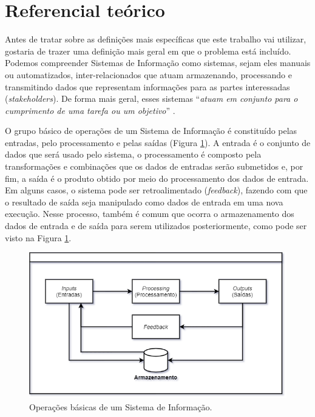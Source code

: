 \section{Referencial teórico}
\label{sec:referencialTeorico}

Antes de tratar sobre as definições mais específicas que este trabalho vai utilizar, gostaria de trazer uma definição mais geral em que o problema está incluído. Podemos compreender Sistemas de Informação como sistemas, sejam eles manuais ou automatizados, inter-relacionados que atuam armazenando, processando e transmitindo dados que representam informações para as partes interessadas (\textit{stakeholders}). De forma mais geral, esses sistemas \enquote{\textit{atuam em conjunto para o cumprimento de uma tarefa ou um objetivo}} \cite{turban2009business}.

O grupo básico de operações de um Sistema de Informação é constituído pelas entradas, pelo processamento e pelas saídas (Figura \ref{fig:operacoesBasicaSistemas}). A entrada é o conjunto de dados que será usado pelo sistema, o processamento é composto pela transformações e combinações que os dados de entradas serão submetidos e, por fim, a saída é o produto obtido por meio do processamento dos dados de entrada. Em alguns casos, o sistema pode ser retroalimentado (\textit{feedback}), fazendo com que o resultado de saída seja manipulado como dados de entrada em uma nova execução. Nesse processo, também é comum que ocorra o armazenamento dos dados de entrada e de saída para serem utilizados posteriormente, como pode ser visto na Figura \ref{fig:operacoesBasicaSistemas}.

\begin{figure}[ht]
\centering
\includegraphics[width=1\textwidth]{imagens/operacoes-basicas-sistema-informacao.png}
\caption{Operações básicas de um Sistema de Informação.}
\label{fig:operacoesBasicaSistemas}
\end{figure}

